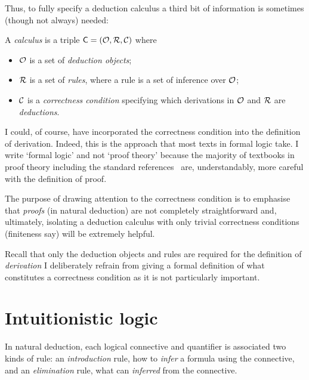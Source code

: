 Thus, to fully specify a deduction calculus a third bit of information is sometimes (though not always) needed:

\begin{definition}
	A \emph{calculus} is a triple \( \mathsf{C} = ( \mathcal{O} , \mathcal{R} , \mathcal{C} ) \) where
	\begin{itemize}
		\item \( \mathcal{O} \) is a set of \emph{deduction objects};
		\item \( \mathcal{R}  \) is a set of \emph{rules}, where a rule is a set of inference over \( \mathcal{O} \); %
		\item \( \mathcal{C} \) is a \emph{correctness condition} specifying which derivations in \( \mathcal{O} \) and \( \mathcal{R} \) are \emph{deductions}.
	\end{itemize}
\end{definition}
%
I could, of course, have incorporated the correctness condition into the definition of derivation.
Indeed, this is the approach that most texts in formal logic take.
I write ‘formal logic’ and not ‘proof theory’ because the majority of textbooks in proof theory including the standard references~\citep{Negri_von_Plato,Troelstra_Schwichtenberg_2000,Schu1950,Pohlers_1989}
are, understandably, more careful with the definition of proof.

The purpose of drawing attention to the correctness condition is to emphasise that \emph{proofs} (in natural deduction) are not completely straightforward and, ultimately, isolating a deduction calculus with only trivial correctness conditions (finiteness say) will be extremely helpful.

Recall that only the deduction objects and rules are required for the definition of \emph{derivation}
I deliberately refrain from giving a formal definition of what constitutes a correctness condition as it is not particularly important.

\section{Intuitionistic logic}


In natural deduction, each logical connective and quantifier is associated two kinds of rule: an \emph{introduction} rule, how to \emph{infer} a formula using the connective, and an \emph{elimination} rule, what can \emph{inferred} from the connective.

